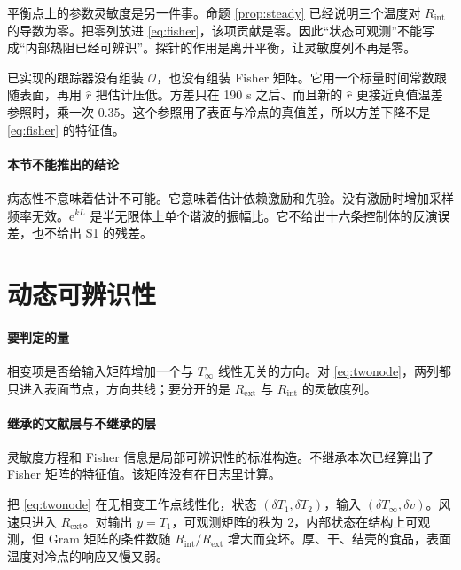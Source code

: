平衡点上的参数灵敏度是另一件事。命题 \ref{prop:steady} 已经说明三个温度对 \(R_{\mathrm{int}}\) 的导数为零。把零列放进 \eqref{eq:fisher}，该项贡献是零。因此“状态可观测”不能写成“内部热阻已经可辨识”。探针的作用是离开平衡，让灵敏度列不再是零。

已实现的跟踪器没有组装 \(\mathcal{O}\)，也没有组装 Fisher 矩阵。它用一个标量时间常数跟随表面，再用 \(\hat r\) 把估计压低。方差只在 190 s 之后、而且新的 \(\hat r\) 更接近真值温差参照时，乘一次 0.35。这个参照用了表面与冷点的真值差，所以方差下降不是 \eqref{eq:fisher} 的特征值。

\paragraph{本节不能推出的结论}
病态性不意味着估计不可能。它意味着估计依赖激励和先验。没有激励时增加采样频率无效。\(\mathrm{e}^{kL}\) 是半无限体上单个谐波的振幅比。它不给出十六条控制体的反演误差，也不给出 S1 的残差。

\section{动态可辨识性}

\paragraph{要判定的量}
相变项是否给输入矩阵增加一个与 \(T_\infty\) 线性无关的方向。对 \eqref{eq:twonode}，两列都只进入表面节点，方向共线；要分开的是 \(R_{\mathrm{ext}}\) 与 \(R_{\mathrm{int}}\) 的灵敏度列。

\paragraph{继承的文献层与不继承的层}
灵敏度方程和 Fisher 信息是局部可辨识性的标准构造。不继承本次已经算出了 Fisher 矩阵的特征值。该矩阵没有在日志里计算。

把 \eqref{eq:twonode} 在无相变工作点线性化，状态 \((\delta T_1,\delta T_2)\)，输入 \((\delta T_\infty,\delta v)\)。风速只进入 \(R_{\mathrm{ext}}\)。对输出 \(y=T_1\)，可观测矩阵的秩为 2，内部状态在结构上可观测，但 Gram 矩阵的条件数随 \(R_{\mathrm{int}}/R_{\mathrm{ext}}\) 增大而变坏。厚、干、结壳的食品，表面温度对冷点的响应又慢又弱。


